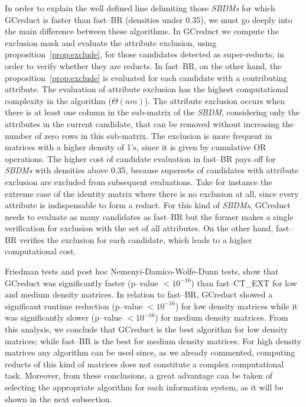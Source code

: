 \documentclass[authoryear,preprint,review,12pt]{elsarticle}
\begin{document}
		
	In order to explain the well defined line delimiting those \textit{SBDMs} for which GCreduct is faster than fast--BR (densities under 0.35),  we must go deeply into the main difference between these algorithms. In GCreduct we compute the exclusion mask and evaluate the attribute exclusion, using proposition~\ref{prop:exclude}, for those candidates detected as super-reducts; in order to verify whether they are reducts. In fast--BR, on the other hand, the proposition~\ref{prop:exclude} is evaluated for each candidate with a contributing attribute. The evaluation of attribute exclusion has the highest computational complexity in the algorithm ($\Theta (nm)$). The attribute exclusion occurs when there is at least one column in the sub-matrix of the \textit{SBDM}, considering only the attributes in the current candidate, that can be removed without increasing the number of zero rows in this sub-matrix. The exclusion is more frequent in matrices with a higher density of 1's, since it is given by cumulative OR operations. The higher cost of candidate evaluation in fast--BR pays off for \textit{SBDMs} with densities above 0.35, because supersets of candidates with attribute exclusion are excluded from subsequent evaluations. Take for instance the extreme case of the identity matrix where there is no exclusion at all, since every attribute is indispensable to form a reduct. For this kind of \textit{SBDMs}, GCreduct needs to evaluate as many candidates as fast--BR but the former makes a single verification for exclusion with the set of all attributes. On the other hand, fast--BR verifies the exclusion for each candidate, which leads to a higher computational cost.
	
	Friedman tests and post hoc Nemenyi-Damico-Wolfe-Dunn tests, show that GCreduct was significantly faster (p--value $< 10^{-16}$) than fast--CT\_EXT for low and medium density matrices. 
	In relation to fast--BR, GCreduct showed a significant runtime reduction (p--value $< 10^{-16}$) for low density matrices while it was significantly slower (p--value $< 10^{-16}$) for medium density matrices. 
	From this analysis, we conclude that GCreduct is the best algorithm for low density matrices; while fast--BR is the best for medium density matrices. For high density matrices any algorithm can be used since, as we already commented, computing reducts of this kind of matrices does not constitute a complex computational task. Moreover, from these conclusions, a great advantage can be taken of selecting the appropriate algorithm for each information system, as it will be shown in the next subsection. 
	
\end{document}
